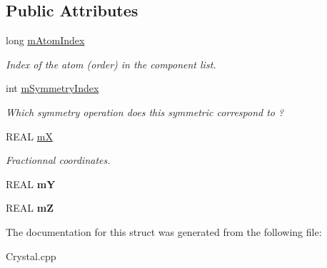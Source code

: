 \subsection*{Public Attributes}
\begin{DoxyCompactItemize}
\item 
\mbox{\label{struct_obj_cryst_1_1_dist_table_internal_position_a9a91cf3d03ed6b349f24b46a79cd4c61}} 
long \mbox{\hyperlink{struct_obj_cryst_1_1_dist_table_internal_position_a9a91cf3d03ed6b349f24b46a79cd4c61}{m\+Atom\+Index}}
\begin{DoxyCompactList}\small\item\em Index of the atom (order) in the component list. \end{DoxyCompactList}\item 
\mbox{\label{struct_obj_cryst_1_1_dist_table_internal_position_a12ffad7145df9d75080c744edde8ea3e}} 
int \mbox{\hyperlink{struct_obj_cryst_1_1_dist_table_internal_position_a12ffad7145df9d75080c744edde8ea3e}{m\+Symmetry\+Index}}
\begin{DoxyCompactList}\small\item\em Which symmetry operation does this symmetric correspond to ? \end{DoxyCompactList}\item 
\mbox{\label{struct_obj_cryst_1_1_dist_table_internal_position_a755410b39877a1ba056d2a28429937e5}} 
R\+E\+AL \mbox{\hyperlink{struct_obj_cryst_1_1_dist_table_internal_position_a755410b39877a1ba056d2a28429937e5}{mX}}
\begin{DoxyCompactList}\small\item\em Fractionnal coordinates. \end{DoxyCompactList}\item 
\mbox{\label{struct_obj_cryst_1_1_dist_table_internal_position_a383d661126d1d35ee897d73273bdd9ab}} 
R\+E\+AL {\bfseries mY}
\item 
\mbox{\label{struct_obj_cryst_1_1_dist_table_internal_position_a4f0e601d439c1b0ac03b337ac022a5fa}} 
R\+E\+AL {\bfseries mZ}
\end{DoxyCompactItemize}


The documentation for this struct was generated from the following file\+:\begin{DoxyCompactItemize}
\item 
Crystal.\+cpp\end{DoxyCompactItemize}
